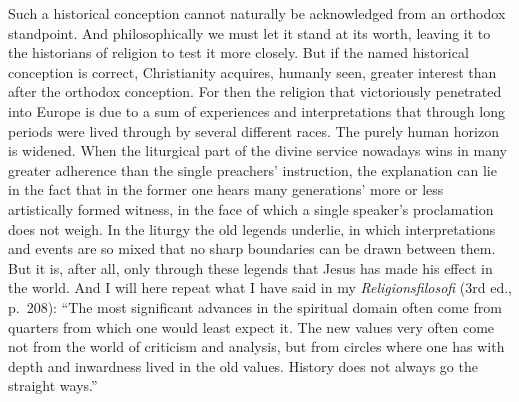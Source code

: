 \documentclass[12pt]{book}
\newcommand{\opage}[1]{\marginnote{\footnotesize\textit{[#1]}}}
\begin{document}
Such a historical conception cannot naturally be acknowledged from an orthodox standpoint. And philosophically
we must let it stand at its worth, leaving it to the historians of religion to test it more closely. But if
the named historical conception is correct, Christianity acquires, humanly seen, greater interest than after
the orthodox conception. For then the religion that victoriously penetrated into Europe is due to a sum of
experiences and interpretations that through long periods were lived through by several different races. The
purely human horizon is widened. When the liturgical part of the divine service nowadays wins in many greater
adherence than the single preachers' instruction, the explanation can lie in the fact that in the former one
hears many generations' more or less artistically formed witness, in the face of which a single speaker's
proclamation does not weigh. In the liturgy the old legends underlie, in which interpretations and events are
so mixed that no sharp boundaries can be drawn between them. But it is, after all, only through these legends
that Jesus has made his effect in the world. And I will here repeat what I have said in my
\textit{Religionsfilosofi} (3rd ed., p.\ 208): ``The most significant advances in the spiritual domain often
come from quarters from which one would least expect it. The new values very often come not from the world of
criticism \opage{114}and analysis, but from circles where one has with depth and inwardness lived in the old values.
History does not always go the straight ways.''
\end{document}
